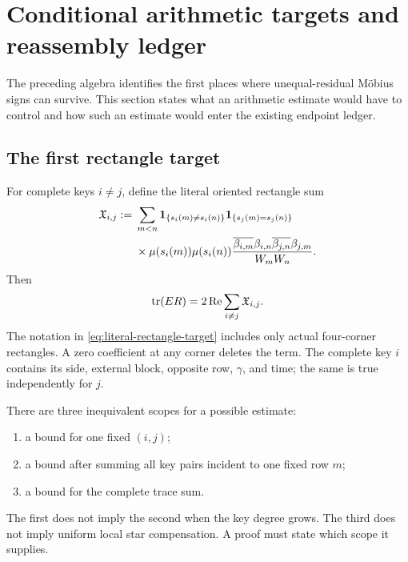 \section{Conditional arithmetic targets and reassembly ledger}
\label{sec:arithmetic-ledger}

The preceding algebra identifies the first places where unequal-residual
Möbius signs can survive.  This section states what an arithmetic estimate
would have to control and how such an estimate would enter the existing
endpoint ledger.

\subsection{The first rectangle target}

For complete keys \(i\ne j\), define the literal oriented rectangle sum
\begin{equation}
\begin{aligned}
\mathfrak X_{i,j}
:={}&
\sum_{m<n}
\mathbf 1_{\{s_i(m)\ne s_i(n)\}}
\mathbf 1_{\{s_j(m)=s_j(n)\}}
\\
&\times
\mu(s_i(m))\mu(s_i(n))
\frac{
\overline{\beta_{i,m}}\beta_{i,n}
\overline{\beta_{j,n}}\beta_{j,m}
}{W_mW_n}.
\end{aligned}
\label{eq:literal-rectangle-target}
\end{equation}
Then
\begin{equation}
 \operatorname{tr}(ER)=2\operatorname{Re}\sum_{i\ne j}\mathfrak X_{i,j}.
 \label{eq:rectangle-target-trace}
\end{equation}
The notation in \eqref{eq:literal-rectangle-target} includes only actual
four-corner rectangles.  A zero coefficient at any corner deletes the
term.  The complete key \(i\) contains its side, external block, opposite
row, \(\gamma\), and time; the same is true independently for \(j\).

There are three inequivalent scopes for a possible estimate:
\begin{enumerate}[label=\textup{(\roman*)},leftmargin=3em]
 \item a bound for one fixed \((i,j)\);
 \item a bound after summing all key pairs incident to one fixed row \(m\);
 \item a bound for the complete trace sum.
\end{enumerate}
The first does not imply the second when the key degree grows.  The third
does not imply uniform local star compensation.  A proof must state which
scope it supplies.

